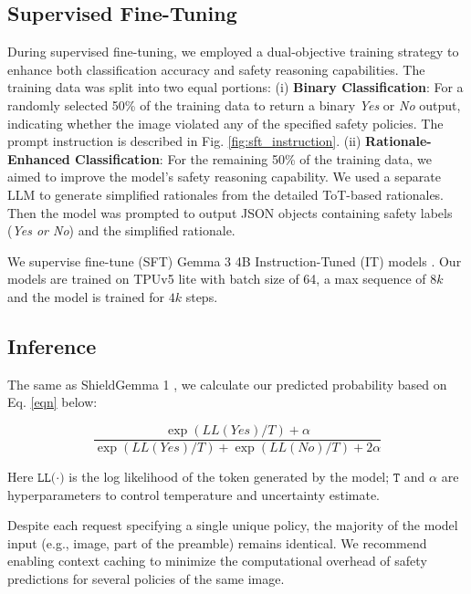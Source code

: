 \subsection{Supervised Fine-Tuning}
During supervised fine-tuning, we employed a dual-objective training strategy to enhance both classification accuracy and safety reasoning capabilities.  The training data was split into two equal portions: (i) \textbf{Binary Classification}: For a randomly selected 50\% of the training data to return a binary \textit{Yes} or \textit{No} output, indicating whether the image violated any of the specified safety policies. The prompt instruction is described in Fig. \ref{fig:sft_instruction}. (ii) \textbf{Rationale-Enhanced Classification}: For the remaining 50\% of the training data, we aimed to improve the model's safety reasoning capability.  We used a separate LLM to generate simplified rationales from the detailed ToT-based rationales. Then the model was prompted to output JSON objects containing safety labels (\textit{Yes or No}) and the simplified rationale.

We supervise fine-tune (SFT) Gemma 3 4B Instruction-Tuned (IT) models \citep{gemma_2025}. Our models are trained on TPUv5 lite with batch size of 64, a max sequence of $8k$ and the model is trained for $4k$ steps. 

\subsection{Inference}

The same as ShieldGemma 1 \citep{zeng2024shieldgemma}, we calculate our predicted probability based on Eq. \ref{eqn} below:

\begin{equation}
\label{eqn}
\frac{\exp(\mathit{LL(Yes)}/T) + \alpha}{\exp(\mathit{LL(Yes)}/T) + \exp(\mathit{LL(No)}/T) + 2\alpha}
\end{equation}

Here $\texttt{LL(·)}$ is the log likelihood of the token generated by the model; $\texttt{T}$ and $\alpha$ are hyperparameters to control temperature and uncertainty estimate.

Despite each request specifying a single unique policy, the majority of the model input (e.g., image, part of the preamble) remains identical. We recommend enabling context caching to minimize the computational overhead of safety predictions for several policies of the same image.
